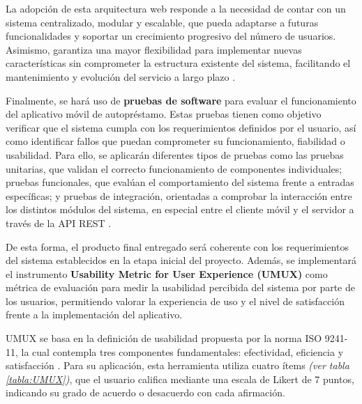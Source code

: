 \documentclass[spanish]{ieee_upb}
\begin{document}
La adopción de esta arquitectura web responde a la necesidad de contar con un sistema centralizado, modular y escalable, que pueda adaptarse a futuras funcionalidades y soportar un crecimiento progresivo del número de usuarios. Asimismo, garantiza una mayor flexibilidad para implementar nuevas características sin comprometer la estructura existente del sistema, facilitando el mantenimiento y evolución del servicio a largo plazo \cite{guillen2019arquitectura}.\vspace{0.3 cm}

Finalmente, se hará uso de \textbf{pruebas de software} para evaluar el funcionamiento del aplicativo móvil de autopréstamo. Estas pruebas tienen como objetivo verificar que el sistema cumpla con los requerimientos definidos por el usuario, así como identificar fallos que puedan comprometer su funcionamiento, fiabilidad o usabilidad. Para ello, se aplicarán diferentes tipos de pruebas como las pruebas unitarias, que validan el correcto funcionamiento de componentes individuales; pruebas funcionales, que evalúan el comportamiento del sistema frente a entradas específicas; y pruebas de integración, orientadas a comprobar la interacción entre los distintos módulos del sistema, en especial entre el cliente móvil y el servidor a través de la API REST \cite{kaner1999testing}.\vspace{0.3 cm}

De esta forma, el producto final entregado será coherente con los requerimientos del sistema establecidos en la etapa inicial del proyecto. Además, se implementará el instrumento \textbf{Usability Metric for User Experience (UMUX)} como métrica de evaluación para medir la usabilidad percibida del sistema por parte de los usuarios, permitiendo valorar la experiencia de uso y el nivel de satisfacción frente a la implementación del aplicativo.\vspace{0.3 cm}

UMUX se basa en la definición de usabilidad propuesta por la norma ISO 9241-11, la cual contempla tres componentes fundamentales: efectividad, eficiencia y satisfacción \cite{umux}. Para su aplicación, esta herramienta utiliza cuatro ítems \textit{(ver tabla \ref{tabla:UMUX})}, que el usuario califica mediante una escala de Likert de 7 puntos, indicando su grado de acuerdo o desacuerdo con cada afirmación.

\end{document}
